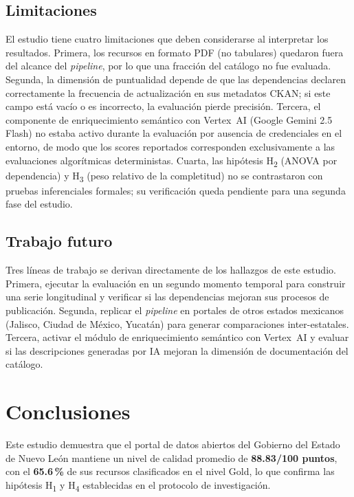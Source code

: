 \documentclass[12pt,letterpaper]{article}
\begin{document}
\subsection{Limitaciones}

El estudio tiene cuatro limitaciones que deben considerarse al interpretar los
resultados. Primera, los recursos en formato PDF (no tabulares) quedaron fuera
del alcance del \textit{pipeline}, por lo que una fracci\'on del cat\'alogo no
fue evaluada. Segunda, la dimensi\'on de puntualidad depende de que las
dependencias declaren correctamente la frecuencia de actualizaci\'on en sus
metadatos CKAN; si este campo est\'a vac\'io o es incorrecto, la evaluaci\'on
pierde precisi\'on. Tercera, el componente de enriquecimiento sem\'antico con
Vertex~AI (Google Gemini 2.5 Flash) no estaba activo durante la evaluaci\'on
por ausencia de credenciales en el entorno, de modo que los scores reportados
corresponden exclusivamente a las evaluaciones algor\'itmicas deterministas.
Cuarta, las hip\'otesis H\textsubscript{2} (ANOVA por dependencia) y
H\textsubscript{3} (peso relativo de la completitud) no se contrastaron con
pruebas inferenciales formales; su verificaci\'on queda pendiente para una
segunda fase del estudio.

\subsection{Trabajo futuro}

Tres l\'ineas de trabajo se derivan directamente de los hallazgos de este
estudio. Primera, ejecutar la evaluaci\'on en un segundo momento temporal
para construir una serie longitudinal y verificar si las dependencias
mejoran sus procesos de publicaci\'on. Segunda, replicar el \textit{pipeline}
en portales de otros estados mexicanos (Jalisco, Ciudad de M\'exico, Yucat\'an)
para generar comparaciones inter-estatales. Tercera, activar el m\'odulo de
enriquecimiento sem\'antico con Vertex~AI y evaluar si las descripciones
generadas por IA mejoran la dimensi\'on de documentaci\'on del cat\'alogo.

\section{Conclusiones}

Este estudio demuestra que el portal de datos abiertos del Gobierno del Estado de
Nuevo Le\'on mantiene un nivel de calidad promedio de \textbf{88.83/100 puntos}, con
el \textbf{65.6\,\%} de sus recursos clasificados en el nivel Gold, lo que confirma
las hip\'otesis H\textsubscript{1} y H\textsubscript{4} establecidas en el protocolo
de investigaci\'on.
\end{document}

